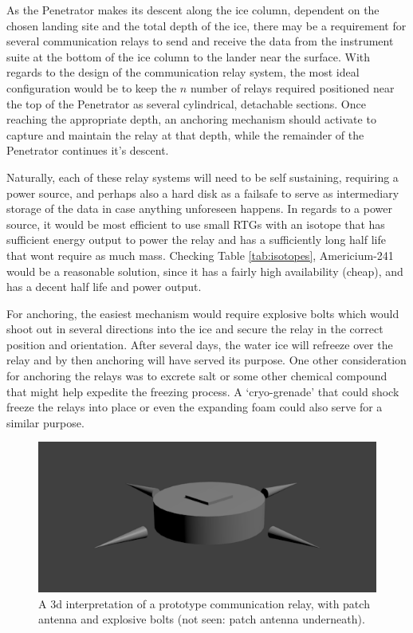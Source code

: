 As the Penetrator makes its descent along the ice column, dependent on the chosen landing site and the total depth of the ice, there may be a requirement for several communication relays to send and receive the data from the instrument suite at the bottom of the ice column to the lander near the surface. With regards to the design of the communication relay system, the most ideal configuration would be to keep the $n$ number of relays required positioned near the top of the Penetrator as several cylindrical, detachable sections. Once reaching the appropriate depth, an anchoring mechanism should activate to capture and maintain the relay at that depth, while the remainder of the Penetrator continues it's descent.

Naturally, each of these relay systems will need to be self sustaining, requiring a power source, and perhaps also a hard disk as a failsafe to serve as intermediary storage of the data in case anything unforeseen happens. In regards to a power source, it would be most efficient to use small RTGs with an isotope that has sufficient energy output to power the relay and has a sufficiently long half life that wont require as much mass. Checking Table \ref{tab:isotopes}, Americium-241 would be a reasonable solution, since it has a fairly high availability (cheap), and has a decent half life and power output.

For anchoring, the easiest mechanism would require explosive bolts which would shoot out in several directions into the ice and secure the relay in the correct position and orientation. After several days, the water ice will refreeze over the relay and by then anchoring will have served its purpose. One other consideration for anchoring the relays was to excrete salt or some other chemical compound that might help expedite the freezing process. A `cryo-grenade' that could shock freeze the relays into place or even the expanding foam could also serve for a similar purpose.

\begin{figure}[!ht]
	\begin{center}
		\includegraphics[width=0.7\columnwidth]{figures/JP/comms_relay.png}
		\caption{A 3d interpretation of a prototype communication relay, with patch antenna and explosive bolts (not seen: patch antenna underneath).\label{fig:comms_relay}}
	\end{center}
\end{figure}

